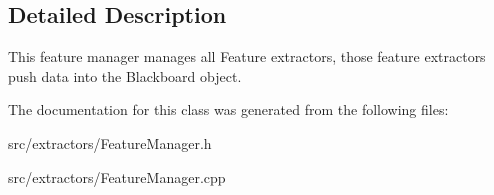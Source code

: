 \subsection{Detailed Description}
This feature manager manages all Feature extractors, those feature extractors push data into the Blackboard object. 

The documentation for this class was generated from the following files\+:\begin{DoxyCompactItemize}
\item 
src/extractors/Feature\+Manager.\+h\item 
src/extractors/Feature\+Manager.\+cpp\end{DoxyCompactItemize}

